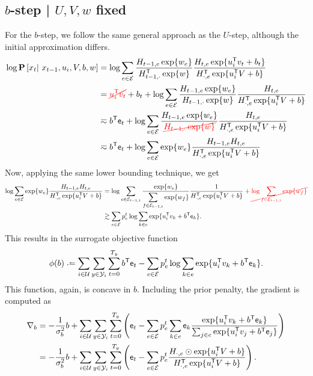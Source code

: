 \documentclass{article}
\newcommand{\ccancel}[2][black]{\color{#1}\cancel{#2}\normalcolor}
\def\e{\ensuremath{\mathsf{e}}}
\def\E{\ensuremath{\mathcal{E}}}
\def\U{\ensuremath{\mathcal{U}}}
\begin{document}
\subsection{$b$-step | $U, V, w$ fixed}
For the $b$-step, we follow the same general approach as the $U$-step, although the initial approximation differs.
\begin{align}
\log\P\left[x_t \given x_{t-1}, u_i, V, b, w\right] 
&= \log\sum_{e\in \E} \frac{H_{t-1,e} \exp\{w_e\} }{H_{t-1,\cdot}\trans \exp\{w\}} \frac{H_{t,e} \exp\{u_i\trans v_t + b_t \} }{H_{\cdot,e}\trans \exp\{u_i\trans V + b \} }\notag\\
&= \ccancel[red]{u_i\trans v_t} + b_t + \log\sum_{e\in \E} \frac{H_{t-1,e}\exp\{w_e\} }{H_{t-1,\cdot}\exp\{w\}}\frac{H_{t, e}}{H_{\cdot,e}\trans \exp\{u_i\trans V + b \} }\notag\\
&\eqsim b\trans \e_t + \log\sum_{e\in \E} \frac{H_{t-1,e} \exp\{w_e\}}{\ccancel[red]{H_{t-1,\cdot} \exp\{w\} }}\frac{ H_{t,e} }{H_{\cdot,e}\trans \exp\{u_i\trans V + b \} }\notag\\
&\eqsim b\trans \e_t + \log\sum_{e\in \E} \exp\{w_e\} \frac{ H_{t-1,e} H_{t,e} }{H_{\cdot,e}\trans \exp\{u_i\trans V + b \} }\notag\\
\end{align}
Now, applying the same lower bounding technique, we get 
\begin{align}
\log\sum_{e\in \E} \exp\{w_e\} \frac{ H_{t-1,e} H_{t,e} }{H_{\cdot,e}\trans \exp\{u_i\trans V + b \} }
&=
\log\sum_{e\in \E_{t-1,t}} \frac{\exp\{w_e\}}{\displaystyle\sum_{f\in \E_{t-1,t}}\exp\{w_f\}} \frac{ 1 }{H_{\cdot,e}\trans \exp\{u_i\trans V + b \} } + \ccancel[red]{\log\sum_{f\in\E_{t-1,t}}
\exp\{w_f\}}\notag\\
&\gtrsim \sum_{e\in\E} p_e^t \log \sum_{k\in e} \exp\{u_i\trans v_k + b\trans \e_k\}\label{eq:bstep:concave}.
\end{align}
This results in the surrogate objective function
\begin{equation}
\phi(b) \defeq \sum_{i\in\U}\sum_{y\in\Y_i}\sum_{t=0}^{T_y} b\trans \e_t - \sum_{e\in\E} p_e^t \log \sum_{k\in e} \exp\{u_i\trans v_k + b\trans \e_k\}.\label{eq:bstep:surrogate}
\end{equation}
This function, again, is concave in $b$.  Including the prior penalty, the gradient is computed as
\begin{align}
\nabla_b &= -\frac{1}{\sigma_b^2} b + \sum_{i\in\U}\sum_{y\in\Y_i}\sum_{t=0}^{T_y} \left( \e_t - \sum_{e\in\E} p_e^t \sum_{k\in e} \e_k \frac{\exp\{u_i\trans v_k + b\trans \e_k\}}{\sum_{j\in e} \exp\{u_i\trans
v_j + b\trans \e_j\}}  \right)\notag\\
&= -\frac{1}{\sigma_b^2} b + \sum_{i\in\U}\sum_{y\in\Y_i}\sum_{t=0}^{T_y} \left( \e_t - \sum_{e\in\E} p_e^t \frac{H_{\cdot, e} \odot \exp\{u_i\trans V + b \}}{ H_{\cdot,e}\trans \exp\{u_i\trans V + b\}}  \right)
\label{eq:bstep:gradient}.
\end{align}
\end{document}
